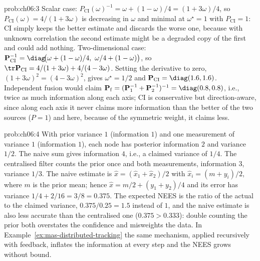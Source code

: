 \begin{sol}{prob:ch06:3}
Scalar case: $P_{\mathrm{CI}}(\omega)^{-1}=\omega+(1-\omega)/4=(1+3\omega)/4$, so $P_{\mathrm{CI}}(\omega)=4/(1+3\omega)$ is decreasing in $\omega$ and minimal at $\omega^{\star}=1$ with $P_{\mathrm{CI}}=1$: CI simply keeps the better estimate and discards the worse one, because with unknown correlation the second estimate might be a degraded copy of the first and could add nothing. Two-dimensional case: $\mathbf{P}_{\mathrm{CI}}^{-1}=\diag\!\big(\omega+(1-\omega)/4,\ \omega/4+(1-\omega)\big)$, so $\tr\mathbf{P}_{\mathrm{CI}}=4/(1+3\omega)+4/(4-3\omega)$. Setting the derivative to zero, $(1+3\omega)^{2}=(4-3\omega)^{2}$, gives $\omega^{\star}=1/2$ and $\mathbf{P}_{\mathrm{CI}}=\diag(1.6,1.6)$. Independent fusion would claim $\mathbf{P}_{\mathrm{f}}=(\mathbf{P}_1^{-1}+\mathbf{P}_2^{-1})^{-1}=\diag(0.8,0.8)$, i.e., twice as much information along each axis; CI is conservative but direction-aware, since along each axis it never claims more information than the better of the two sources ($P=1$) and here, because of the symmetric weight, it claims less.
\end{sol}

\begin{sol}{prob:ch06:4}
With prior variance $1$ (information $1$) and one measurement of variance $1$ (information $1$), each node has posterior information $2$ and variance $1/2$. The naive sum gives information $4$, i.e., a claimed variance of $1/4$. The centralised filter counts the prior once and both measurements, information $3$, variance $1/3$. The naive estimate is $\widehat{x}=(\widehat{x}_1+\widehat{x}_2)/2$ with $\widehat{x}_i=(m+y_i)/2$, where $m$ is the prior mean; hence $\widehat{x}=m/2+(y_1+y_2)/4$ and its error has variance $1/4+2/16=3/8=0.375$. The expected NEES is the ratio of the actual to the claimed variance, $0.375/0.25=1.5$ instead of $1$, and the naive estimate is also less accurate than the centralised one ($0.375>0.333$): double counting the prior both overstates the confidence and misweights the data. In Example~\ref{ex:mas-distributed-tracking} the same mechanism, applied recursively with feedback, inflates the information at every step and the NEES grows without bound.
\end{sol}

